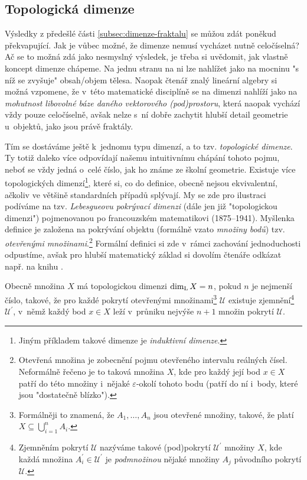 \subsection{Topologická dimenze}\label{subsec:topologicka-dimenze}

Výsledky z předešlé části \ref{subsec:dimenze-fraktalu} se můžou zdát poněkud překvapující. Jak je vůbec možné, že dimenze nemusí vycházet nutně celočíselná? Ač se to možná zdá jako nesmyslný výsledek, je třeba si uvědomit, jak vlastně koncept dimenze chápeme. Na jednu stranu na ni lze nahlížet jako na mocninu "s níž se zvyšuje" obsah/objem tělesa. Naopak čtenář znalý lineární algebry si možná vzpomene, že v~této matematické disciplíně se na dimenzi nahlíží jako na \emph{mohutnost libovolné báze daného vektorového (pod)prostoru}, která naopak vychází vždy pouze celočíselně, avšak nelze s~ní dobře zachytit hlubší detail geometrie u~objektů, jako jsou právě fraktály.

Tím se dostáváme ještě k~jednomu typu dimenzí, a to tzv. \emph{topologické dimenze}. Ty totiž daleko více odpovídají našemu intuitivnímu chápání tohoto pojmu, neboť se vždy jedná o~celé číslo, jak ho známe ze školní geometrie. Existuje více topologických dimenzí\footnote{Jiným příkladem takové dimenze je \emph{induktivní dimenze}.}, které si, co do definice, obecně nejsou ekvivalentní, ačkoliv ve většině standardních případů splývají. My se zde pro ilustraci podíváme na tzv. \emph{Lebesgueovu pokrývací dimenzi} (dále jen již "topologickou dimenzi") pojmenovanou po francouzském matematikovi  (1875--1941). Myšlenka definice je založena na pokrývání objektu (formálně vzato \emph{množiny bodů}) tzv. \emph{otevřenými množinami}.\footnote{Otevřená množina je zobecnění pojmu otevřeného intervalu reálných čísel. Neformálně řečeno je to taková množina $X$, kde pro každý její bod $x\in X$ patří do této množiny i~nějaké $\varepsilon$-okolí tohoto bodu (patří do ní i~body, které jsou "dostatečně blízko").} Formální definici si zde v~rámci zachování jednoduchosti odpustíme, avšak pro hlubší matematický základ si dovolím čtenáře odkázat např. na knihu \cite{Engelking1989}.

Obecně množina $X$ má topologickou dimenzi $\operatorname{dim_L}{X}=n$, pokud $n$ je nejmenší číslo, takové, že pro každé pokrytí otevřenými množinami\footnote{Formálněji to znamená, že $A_1,\dots,A_n$ jsou otevřené množiny, takové, že platí $X\subseteq\bigcup_{i=1}^n{A_i}$.} $\mathcal{U}$ existuje zjemnění\footnote{Zjemněním pokrytí $\mathcal{U}$ nazýváme takové (pod)pokrytí $\mathcal{U}^\prime$ množiny $X$, kde každá množina $A_i^\prime\in\mathcal{U}^\prime$ je \emph{podmnožinou} nějaké množiny $A_j$ původního pokrytí $\mathcal{U}$.} $\mathcal{U}^\prime$, v~němž každý bod $x\in X$ leží v~průniku nejvýše $n+1$ množin pokrytí $\mathcal{U}$.

